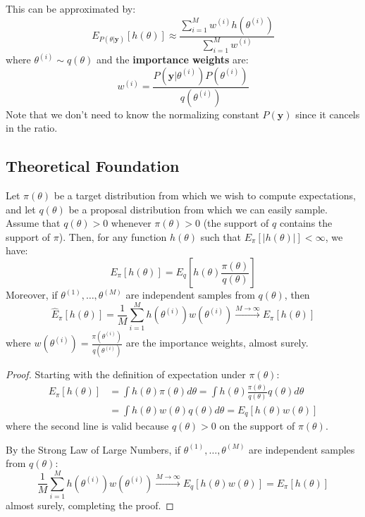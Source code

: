 This can be approximated by:
\begin{equation}
\boxed{E_{P(\theta|\mathbf{y})}[h(\theta)] \approx \frac{\sum_{i=1}^M w^{(i)} h(\theta^{(i)})}{\sum_{i=1}^M w^{(i)}}}
\end{equation}
where $\theta^{(i)} \sim q(\theta)$ and the \textbf{importance weights} are:
\begin{equation}
w^{(i)} = \frac{P(\mathbf{y}|\theta^{(i)}) P(\theta^{(i)})}{q(\theta^{(i)})}
\end{equation}
Note that we don't need to know the normalizing constant $P(\mathbf{y})$ since it cancels in the ratio.

\subsection{Theoretical Foundation}
\begin{theorem}\label{thm:importance_sampling}
Let $\pi(\theta)$ be a target distribution from which we wish to compute expectations, and let $q(\theta)$ be a proposal distribution from which we can easily sample. Assume that $q(\theta) > 0$ whenever $\pi(\theta) > 0$ (the support of $q$ contains the support of $\pi$). Then, for any function $h(\theta)$ such that $E_{\pi}[|h(\theta)|] < \infty$, we have:
$$E_{\pi}[h(\theta)] = E_q\left[h(\theta) \frac{\pi(\theta)}{q(\theta)}\right]$$
Moreover, if $\theta^{(1)}, \dots, \theta^{(M)}$ are independent samples from $q(\theta)$, then
$$\hat{E}_{\pi}[h(\theta)] = \frac{1}{M}\sum_{i=1}^M h(\theta^{(i)}) w(\theta^{(i)}) \xrightarrow{M \to \infty} E_{\pi}[h(\theta)]$$
where $w(\theta^{(i)}) = \frac{\pi(\theta^{(i)})}{q(\theta^{(i)})}$ are the importance weights, almost surely.
\end{theorem}

\begin{proof}
Starting with the definition of expectation under $\pi(\theta)$:
\begin{align*}
E_{\pi}[h(\theta)] &= \int h(\theta) \pi(\theta) d\theta = \int h(\theta) \frac{\pi(\theta)}{q(\theta)} q(\theta) d\theta \\
&= \int h(\theta) w(\theta) q(\theta) d\theta = E_q[h(\theta) w(\theta)]
\end{align*}
where the second line is valid because $q(\theta) > 0$ on the support of $\pi(\theta)$.

By the Strong Law of Large Numbers, if $\theta^{(1)}, \dots, \theta^{(M)}$ are independent samples from $q(\theta)$:
$$\frac{1}{M}\sum_{i=1}^M h(\theta^{(i)}) w(\theta^{(i)}) \xrightarrow{M \to \infty} E_q[h(\theta) w(\theta)] = E_{\pi}[h(\theta)]$$
almost surely, completing the proof.
\end{proof}

